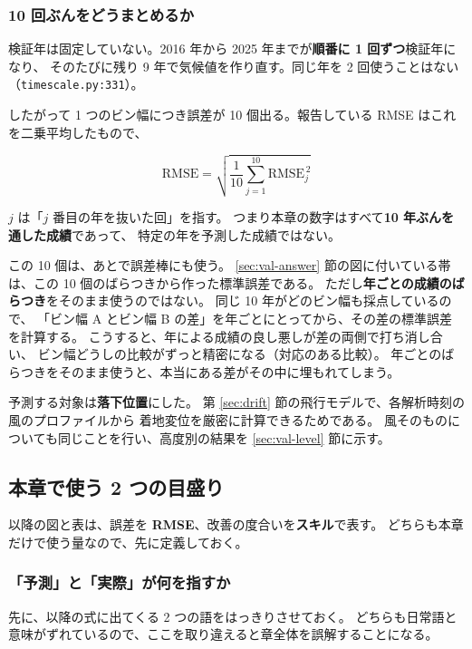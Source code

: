 \subsubsection{10 回ぶんをどうまとめるか}
\label{sec:val-folds}

検証年は固定していない。2016 年から 2025 年までが\textbf{順番に 1 回ずつ}検証年になり、
そのたびに残り 9 年で気候値を作り直す。同じ年を 2 回使うことはない
（\texttt{timescale.py:331}）。

したがって 1 つのビン幅につき誤差が 10 個出る。報告している RMSE はこれを二乗平均したもので、

\begin{equation}
  \mathrm{RMSE} = \sqrt{\frac{1}{10}\sum_{j=1}^{10} \mathrm{RMSE}_j^{\,2}}
  \label{eq:fold-pool}
\end{equation}

$j$ は「$j$ 番目の年を抜いた回」を指す。
つまり本章の数字はすべて\textbf{10 年ぶんを通した成績}であって、
特定の年を予測した成績ではない。

この 10 個は、あとで誤差棒にも使う。
\ref{sec:val-answer} 節の図に付いている帯は、この 10 個のばらつきから作った標準誤差である。
ただし\textbf{年ごとの成績のばらつき}をそのまま使うのではない。
同じ 10 年がどのビン幅も採点しているので、
「ビン幅 A とビン幅 B の差」を年ごとにとってから、その差の標準誤差を計算する。
こうすると、年による成績の良し悪しが差の両側で打ち消し合い、
ビン幅どうしの比較がずっと精密になる（対応のある比較）。
年ごとのばらつきをそのまま使うと、本当にある差がその中に埋もれてしまう。

予測する対象は\textbf{落下位置}にした。
第 \ref{sec:drift} 節の飛行モデルで、各解析時刻の風のプロファイルから
着地変位を厳密に計算できるためである。
風そのものについても同じことを行い、高度別の結果を \ref{sec:val-level} 節に示す。

\subsection{本章で使う 2 つの目盛り}
\label{sec:val-metrics}

以降の図と表は、誤差を \textbf{RMSE}、改善の度合いを\textbf{スキル}で表す。
どちらも本章だけで使う量なので、先に定義しておく。

\subsubsection{「予測」と「実際」が何を指すか}
\label{sec:val-what}

先に、以降の式に出てくる 2 つの語をはっきりさせておく。
どちらも日常語と意味がずれているので、ここを取り違えると章全体を誤解することになる。

